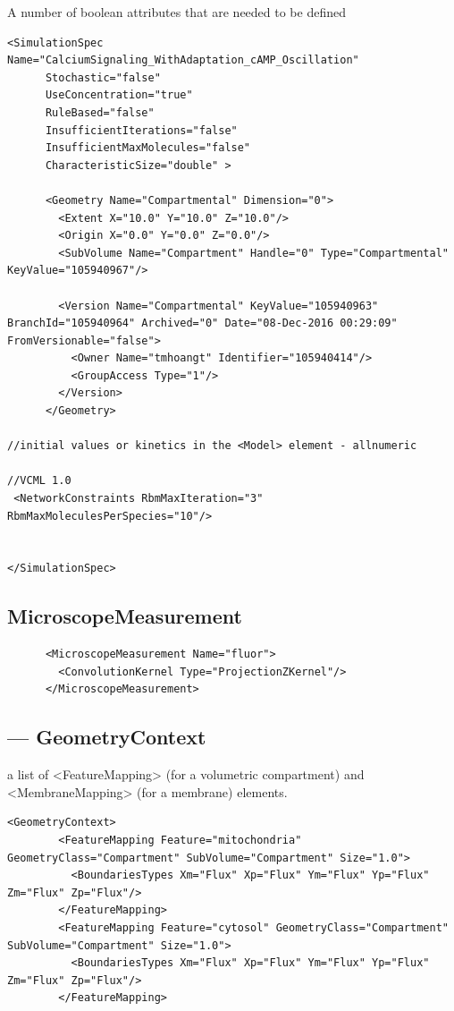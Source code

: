 A number of boolean attributes that are needed to be defined

{\tiny
\begin{verbatim}
<SimulationSpec Name="CalciumSignaling_WithAdaptation_cAMP_Oscillation"
      Stochastic="false" 
      UseConcentration="true" 
      RuleBased="false"
      InsufficientIterations="false" 
      InsufficientMaxMolecules="false"
      CharacteristicSize="double" >
      
      <Geometry Name="Compartmental" Dimension="0">
        <Extent X="10.0" Y="10.0" Z="10.0"/>
        <Origin X="0.0" Y="0.0" Z="0.0"/>
        <SubVolume Name="Compartment" Handle="0" Type="Compartmental" KeyValue="105940967"/>

        <Version Name="Compartmental" KeyValue="105940963" BranchId="105940964" Archived="0" Date="08-Dec-2016 00:29:09" FromVersionable="false">
          <Owner Name="tmhoangt" Identifier="105940414"/>
          <GroupAccess Type="1"/>
        </Version>
      </Geometry>
            
//initial values or kinetics in the <Model> element - allnumeric 

//VCML 1.0
 <NetworkConstraints RbmMaxIteration="3" RbmMaxMoleculesPerSpecies="10"/>
 
 
</SimulationSpec>
\end{verbatim}
}

\subsection{MicroscopeMeasurement}
\label{sec:MicroscopeMeasurement-VCML}

\begin{verbatim}
      <MicroscopeMeasurement Name="fluor">
        <ConvolutionKernel Type="ProjectionZKernel"/>
      </MicroscopeMeasurement>
\end{verbatim}


\subsection{--- GeometryContext}

a list of <FeatureMapping> (for a volumetric compartment) and <MembraneMapping>
(for a membrane) elements.

{\tiny
\begin{verbatim}
<GeometryContext>
        <FeatureMapping Feature="mitochondria" GeometryClass="Compartment" SubVolume="Compartment" Size="1.0">
          <BoundariesTypes Xm="Flux" Xp="Flux" Ym="Flux" Yp="Flux" Zm="Flux" Zp="Flux"/>
        </FeatureMapping>
        <FeatureMapping Feature="cytosol" GeometryClass="Compartment" SubVolume="Compartment" Size="1.0">
          <BoundariesTypes Xm="Flux" Xp="Flux" Ym="Flux" Yp="Flux" Zm="Flux" Zp="Flux"/>
        </FeatureMapping>
\end{verbatim}
}

